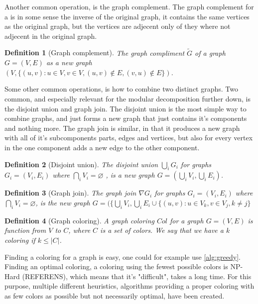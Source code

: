\documentclass{amsart}
\newtheorem{definition}{Definition}[section]
\begin{document}
Another common operation, is the graph complement. The graph complement for a
is in some sense the inverse of the original graph, it contains the same
vertices as the original graph, but the vertices are adjecent only of they where
not adjecent in the original graph.

\begin{definition}[Graph complement]
    The graph compliment $\widetilde{G}$ of a graph $G = (V,E)$ as a new graph 
    $(V,\{ (u,v) : u \in V,v \in V, (u,v) \notin E,(v,u) \notin E\})$.
\end{definition}

Some other common operations, is how to combine two distinct graphs. Two common,
and especially relevant for the modular decomposition further down, is the
disjoint union and graph join. The disjoint union is the most simple way to
combine graphs, and just forms a new graph that just contains it's components
and nothing more. 
The graph join is similar, in that it produces a new graph with all of it's
subcomponents parts, edges and vertices, but also for every vertex in the one
component adds a new edge to the other component.

\begin{definition}[Disjoint union]
    The disjoint union $\bigcup_i G_i$ for graphs $G_i = (V_i,E_i)$ where 
    $\bigcap_i V_i = \varnothing $ , is a new graph
    $G = \left( \bigcup_i V_i,\bigcup_i E_i \right)$.
\end{definition}

\begin{definition}[Graph join]
    The graph join $\nabla G_i$ for graphs $G_i = (V_i,E_i)$ where 
    $\bigcap_i V_i = \varnothing$, is the new graph $G = (\{\bigcup_i V_i,
    \bigcup_i E_i \cup \{(u,v) : u \in V_k, v \in V_j, k \neq j \}$
\end{definition}


\begin{definition}[Graph coloring]
    A graph coloring $Col$ for a graph $G = (V,E)$
    is function from $V$ to $C$, where $C$ is a set of colors. We say that 
    we have a $k$ coloring if $k \leq |C|$.
\end{definition}

Finding a coloring for a graph is easy, one could for example use 
\autoref{alg:greedy}. Finding an optimal coloring, a coloring using the fewest
possible colors is NP-Hard (REFERENS), which means that it's "difficult", takes
a long time. For this purpose, multiple different heuristics, algorithms
providing a proper coloring with as few colors as possible but not necessarily
optimal, have been created.
\end{document}
